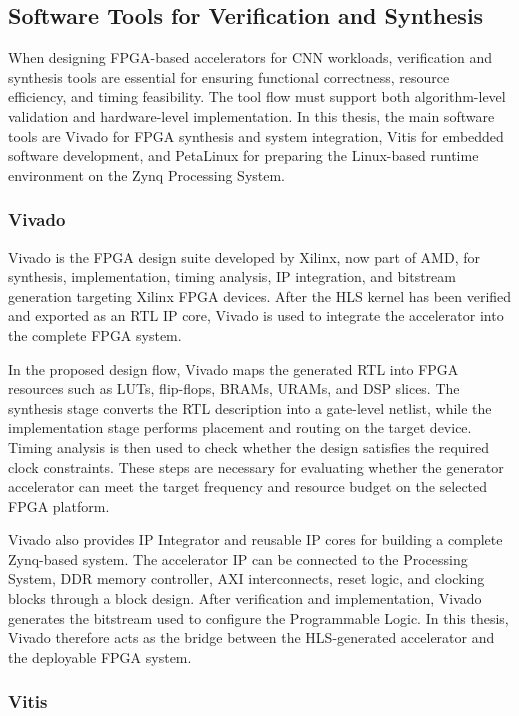 \subsection{Software Tools for Verification and Synthesis}

When designing FPGA-based accelerators for CNN workloads, verification and synthesis tools are essential for ensuring functional correctness, resource efficiency, and timing feasibility. The tool flow must support both algorithm-level validation and hardware-level implementation. In this thesis, the main software tools are Vivado for FPGA synthesis and system integration, Vitis for embedded software development, and PetaLinux for preparing the Linux-based runtime environment on the Zynq Processing System.

\subsubsection{Vivado}

Vivado is the FPGA design suite developed by Xilinx, now part of AMD, for synthesis, implementation, timing analysis, IP integration, and bitstream generation targeting Xilinx FPGA devices. After the HLS kernel has been verified and exported as an RTL IP core, Vivado is used to integrate the accelerator into the complete FPGA system.

In the proposed design flow, Vivado maps the generated RTL into FPGA resources such as LUTs, flip-flops, BRAMs, URAMs, and DSP slices. The synthesis stage converts the RTL description into a gate-level netlist, while the implementation stage performs placement and routing on the target device. Timing analysis is then used to check whether the design satisfies the required clock constraints. These steps are necessary for evaluating whether the generator accelerator can meet the target frequency and resource budget on the selected FPGA platform.

Vivado also provides IP Integrator and reusable IP cores for building a complete Zynq-based system. The accelerator IP can be connected to the Processing System, DDR memory controller, AXI interconnects, reset logic, and clocking blocks through a block design. After verification and implementation, Vivado generates the bitstream used to configure the Programmable Logic. In this thesis, Vivado therefore acts as the bridge between the HLS-generated accelerator and the deployable FPGA system.

\subsubsection{Vitis}

